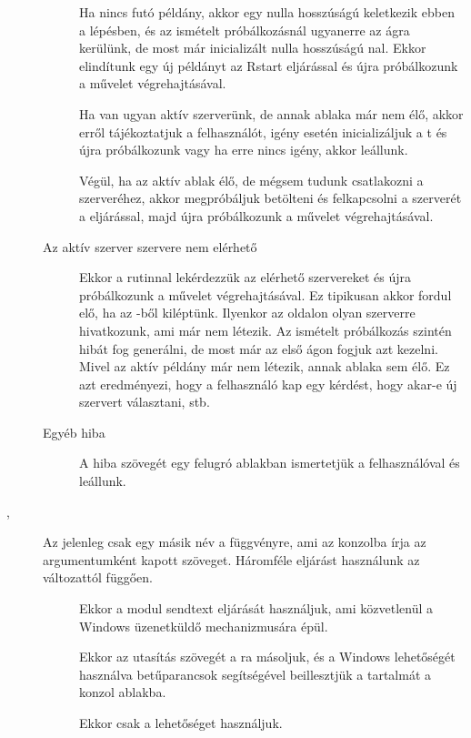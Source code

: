 \begin{description}
\begin{description}
    Ha nincs futó 
    példány, akkor egy nulla hosszúságú  keletkezik ebben a
    lépésben, és az ismételt próbálkozásnál ugyanerre az ágra
    kerülünk, de most már inicializált nulla hosszúságú 
    nal. Ekkor elindítunk egy új  példányt az Rstart
    eljárással és újra próbálkozunk a művelet végrehajtásával.
    
    Ha
    van ugyan aktív  szerverünk, de annak ablaka már nem élő, akkor
    erről tájékoztatjuk a felhasználót, igény esetén
    inicializáljuk a t és újra próbálkozunk vagy ha
    erre nincs igény, akkor leállunk. 

    Végül, ha az aktív  ablak élő, de mégsem
    tudunk csatlakozni a  szerveréhez,  akkor megpróbáljuk
    betölteni és felkapcsolni a  szerverét a 
    eljárással, 
    majd újra próbálkozunk a művelet végrehajtásával.  

    \item[{Az aktív \code{R} szerver \code{COM} szervere nem elérhető}]
      Ekkor a  rutinnal 
    lekérdezzük az elérhető  szervereket és újra próbálkozunk a
    művelet végrehajtásával. Ez tipikusan akkor fordul elő, ha az
    -ből kiléptünk. Ilyenkor az  oldalon olyan szerverre
    hivatkozunk, ami már nem létezik. Az ismételt próbálkozás szintén
    hibát fog generálni, de most már az első ágon fogjuk azt
    kezelni. Mivel  az aktív  példány már nem létezik, annak ablaka
    sem élő. Ez azt eredményezi, hogy a felhasználó kap egy
    kérdést, hogy akar-e új  szervert választani, stb.  
    \item[{Egyéb hiba}] A hiba szövegét egy felugró ablakban
      ismertetjük a felhasználóval és  leállunk.
  \end{description}

\item[\code{REvalAsync}, \code{cmdToR}] Az  jelenleg
    csak egy másik 
  név a  függvényre, ami az  konzolba írja az argumentumként
  kapott szöveget. Háromféle eljárást használunk az  változattól
  függően. 
 \begin{description}
  \item[] Ekkor a  modul sendtext eljárását
    használjuk, ami 
    közvetlenül a Windows üzenetküldő mechanizmusára épül.  
  \item[] Ekkor az utasítás szövegét a ra
    másoljuk, és a Windows 
     lehetőségét használva betűparancsok segítségével
    beillesztjük a  tartalmát a konzol ablakba.  
  \item[]  Ekkor csak a  lehetőséget
    használjuk. 
  \end{description}


\end{description}
